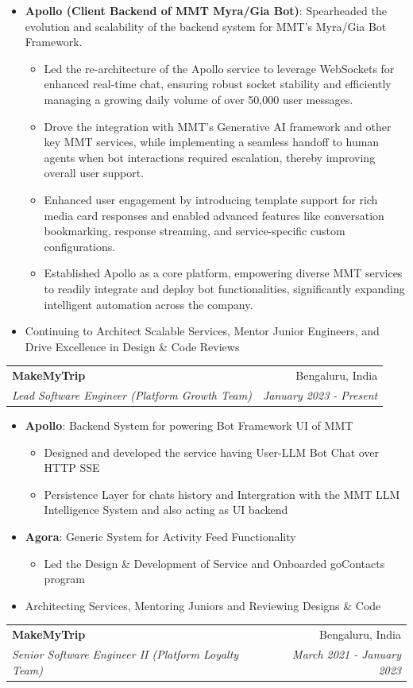 \documentclass[letterpaper,11pt]{article}
\makeatletter
\newcommand{\resumeItem}[2]{
  \item\small{
    \textbf{#1}{: #2 \vspace{-2pt}}
  }
}
\newcommand{\resumeItemNew}[1]{
	\item\small{
		{#1 \vspace{-2pt}}
	}
}
\newcommand{\resumeItemLevelTwo}[1]{
	\item\small{
		{#1 \vspace{-2pt}}
	}
}
\newcommand{\resumeSubheading}[4]{
  \vspace{-1pt}\item
    \begin{tabular*}{0.97\textwidth}[t]{l@{\extracolsep{\fill}}r}
      \textbf{#1} & #2 \\
      \textit{\small#3} & \textit{\small #4} \\
    \end{tabular*}\vspace{-5pt}
}
\newcommand{\resumeItemListStart}{\begin{itemize}}
\newcommand{\resumeItemListEnd}{\end{itemize}\vspace{-5pt}}
\newcommand{\resumeItemListStartLevelTwo}{\begin{itemize}}
\newcommand{\resumeItemListEndLevelTwo}{\end{itemize}}
\makeatother
\begin{document}
	  \resumeItemListStart
	  \resumeItem{Apollo (Client Backend of MMT Myra/Gia Bot)}
	  {Spearheaded the evolution and scalability of the backend system for MMT's Myra/Gia Bot Framework.}
	  \resumeItemListStartLevelTwo
	  \resumeItemLevelTwo
	  {Led the re-architecture of the Apollo service to leverage WebSockets for enhanced real-time chat, ensuring robust socket stability and efficiently managing a growing daily volume of over 50,000 user messages.}
	  \resumeItemLevelTwo
	  {Drove the integration with MMT's Generative AI framework and other key MMT services, while implementing a seamless handoff to human agents when bot interactions required escalation, thereby improving overall user support.}
	  \resumeItemLevelTwo
	  {Enhanced user engagement by introducing template support for rich media card responses and enabled advanced features like conversation bookmarking, response streaming, and service-specific custom configurations.}
	  \resumeItemLevelTwo
	  {Established Apollo as a core platform, empowering diverse MMT services to readily integrate and deploy bot functionalities, significantly expanding intelligent automation across the company.}
	  \resumeItemListEndLevelTwo
	  \resumeItemNew
	  {Continuing to Architect Scalable Services, Mentor Junior Engineers, and Drive Excellence in Design \& Code Reviews}
	  \resumeItemListEnd
  
	  \resumeSubheading
	  {MakeMyTrip}{Bengaluru, India}
	  {Lead Software Engineer  (Platform Growth Team)}{January 2023 - Present}
	  
	  \resumeItemListStart
	  \resumeItem{Apollo}
	  {Backend System for powering Bot Framework UI of MMT }
	  \resumeItemListStartLevelTwo
	  \resumeItemLevelTwo
	  {Designed and developed the service having User-LLM Bot Chat over HTTP SSE}
	   \resumeItemLevelTwo
	  {Persistence Layer for chats history and Intergration with the MMT LLM Intelligence System and also acting as UI backend}
	  \resumeItemListEndLevelTwo
	  \resumeItem{Agora}
	  {Generic System for Activity Feed Functionality}
	   \resumeItemListStartLevelTwo
	  \resumeItemLevelTwo
	  {Led the Design \& Development of Service and Onboarded goContacts program}
	  	  \resumeItemListEndLevelTwo
	  	  
  	  	\resumeItemNew
	  {Architecting Services, Mentoring Juniors and Reviewing Designs \& Code}	
	  \resumeItemListEnd
  
	  \resumeSubheading
	  {MakeMyTrip}{Bengaluru, India}
	  {Senior Software Engineer II (Platform Loyalty Team)}{March 2021 - January 2023}
	  
\end{document}
